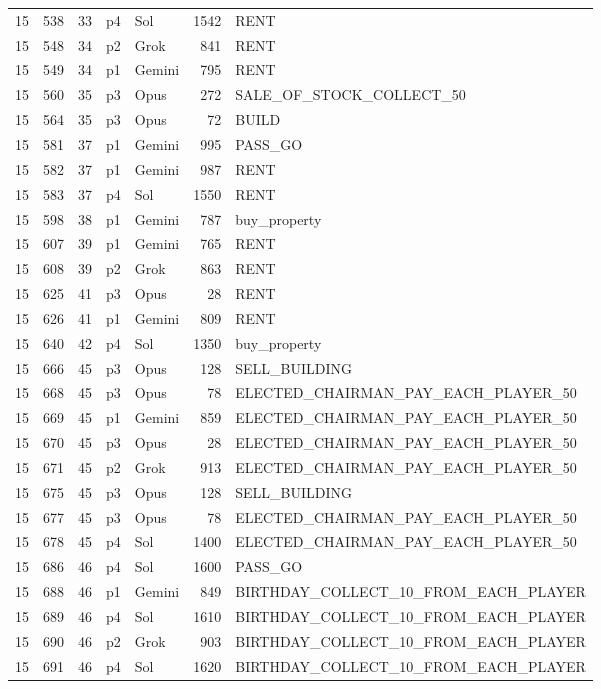 \begin{longtable}{r r r l l r L{2.2in}}
15 & 538 & 33 & p4 & Sol & 1542 & RENT \\
15 & 548 & 34 & p2 & Grok & 841 & RENT \\
15 & 549 & 34 & p1 & Gemini & 795 & RENT \\
15 & 560 & 35 & p3 & Opus & 272 & SALE\_OF\_STOCK\_COLLECT\_50 \\
15 & 564 & 35 & p3 & Opus & 72 & BUILD \\
15 & 581 & 37 & p1 & Gemini & 995 & PASS\_GO \\
15 & 582 & 37 & p1 & Gemini & 987 & RENT \\
15 & 583 & 37 & p4 & Sol & 1550 & RENT \\
15 & 598 & 38 & p1 & Gemini & 787 & buy\_property \\
15 & 607 & 39 & p1 & Gemini & 765 & RENT \\
15 & 608 & 39 & p2 & Grok & 863 & RENT \\
15 & 625 & 41 & p3 & Opus & 28 & RENT \\
15 & 626 & 41 & p1 & Gemini & 809 & RENT \\
15 & 640 & 42 & p4 & Sol & 1350 & buy\_property \\
15 & 666 & 45 & p3 & Opus & 128 & SELL\_BUILDING \\
15 & 668 & 45 & p3 & Opus & 78 & ELECTED\_CHAIRMAN\_PAY\_EACH\_PLAYER\_50 \\
15 & 669 & 45 & p1 & Gemini & 859 & ELECTED\_CHAIRMAN\_PAY\_EACH\_PLAYER\_50 \\
15 & 670 & 45 & p3 & Opus & 28 & ELECTED\_CHAIRMAN\_PAY\_EACH\_PLAYER\_50 \\
15 & 671 & 45 & p2 & Grok & 913 & ELECTED\_CHAIRMAN\_PAY\_EACH\_PLAYER\_50 \\
15 & 675 & 45 & p3 & Opus & 128 & SELL\_BUILDING \\
15 & 677 & 45 & p3 & Opus & 78 & ELECTED\_CHAIRMAN\_PAY\_EACH\_PLAYER\_50 \\
15 & 678 & 45 & p4 & Sol & 1400 & ELECTED\_CHAIRMAN\_PAY\_EACH\_PLAYER\_50 \\
15 & 686 & 46 & p4 & Sol & 1600 & PASS\_GO \\
15 & 688 & 46 & p1 & Gemini & 849 & BIRTHDAY\_COLLECT\_10\_FROM\_EACH\_PLAYER \\
15 & 689 & 46 & p4 & Sol & 1610 & BIRTHDAY\_COLLECT\_10\_FROM\_EACH\_PLAYER \\
15 & 690 & 46 & p2 & Grok & 903 & BIRTHDAY\_COLLECT\_10\_FROM\_EACH\_PLAYER \\
15 & 691 & 46 & p4 & Sol & 1620 & BIRTHDAY\_COLLECT\_10\_FROM\_EACH\_PLAYER \\

\end{longtable}
